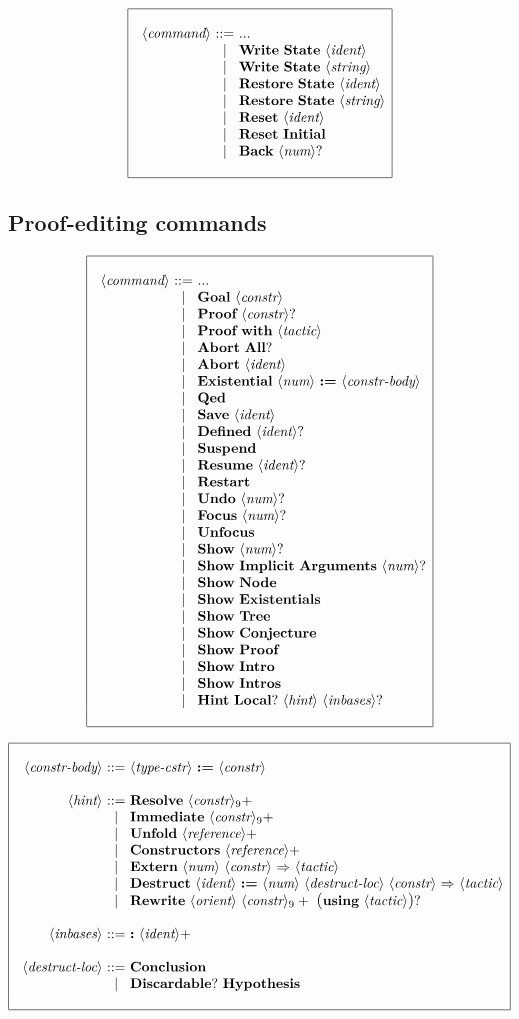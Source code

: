 \documentclass{article}
\makeatletter
\def\GR#1{\text{\large(}#1\text{\large)}}
\def\NT#1{\langle\textit{#1}\rangle}
\def\NTL#1#2{\langle\textit{#1}\rangle_{#2}}
\def\TERM#1{{\bf\textrm{\bf #1}}}
\def\KWD#1{\TERM{#1}}
\def\PLUS#1{#1+}
\def\OPT#1{#1?}
\def\OPTGR#1{\GR{#1}?}
\newenvironment{cadre}
        {\begin{array}{|c|}\hline\\}
        {\\\\\hline\end{array}}
\newenvironment{rulebox}
        {$$\begin{cadre}\begin{array}{r@{~}c@{~}l@{}l@{}r}}
        {\end{array}\end{cadre}$$}
\def\DEFNT#1{\NT{#1} & ::= &}
\def\EXTNT#1{\NT{#1} & ::= & ... \\&|&}
\def\SEPDEF{\\\\}
\def\nlsep{\\&|&}
\newenvironment{rules}
        {\begin{center}\begin{rulebox}}
        {\end{rulebox}\end{center}}
\makeatother
\begin{document}
\begin{rules}
\EXTNT{command}
       \TERM{Write}~\TERM{State}~\NT{ident}
\nlsep \TERM{Write}~\TERM{State}~\NT{string}
\nlsep \TERM{Restore}~\TERM{State}~\NT{ident}
\nlsep \TERM{Restore}~\TERM{State}~\NT{string}
\nlsep \TERM{Reset}~\NT{ident}
\nlsep \TERM{Reset}~\TERM{Initial}
\nlsep \TERM{Back}~\OPT{\NT{num}}
\end{rules}

\subsection{Proof-editing commands}

\begin{rules}
\EXTNT{command}
       \TERM{Goal}~\NT{constr}
\nlsep \TERM{Proof}~\OPT{\NT{constr}}
\nlsep \TERM{Proof}~\KWD{with}~\NT{tactic}
\nlsep \TERM{Abort}~\OPT{\TERM{All}}
\nlsep \TERM{Abort}~\NT{ident}
\nlsep \TERM{Existential}~\NT{num}~\KWD{:=}~\NT{constr-body}
\nlsep \TERM{Qed}
\nlsep \TERM{Save}~\NT{ident}
\nlsep \TERM{Defined}~\OPT{\NT{ident}}
\nlsep \TERM{Suspend}
\nlsep \TERM{Resume}~\OPT{\NT{ident}}
\nlsep \TERM{Restart}
\nlsep \TERM{Undo}~\OPT{\NT{num}}
\nlsep \TERM{Focus}~\OPT{\NT{num}}
\nlsep \TERM{Unfocus}
\nlsep \TERM{Show}~\OPT{\NT{num}}
\nlsep \TERM{Show}~\TERM{Implicit}~\TERM{Arguments}~\OPT{\NT{num}}
\nlsep \TERM{Show}~\TERM{Node}
\nlsep \TERM{Show}~\TERM{Existentials}
\nlsep \TERM{Show}~\TERM{Tree}
\nlsep \TERM{Show}~\TERM{Conjecture}
\nlsep \TERM{Show}~\TERM{Proof}
\nlsep \TERM{Show}~\TERM{Intro}
\nlsep \TERM{Show}~\TERM{Intros}
\nlsep \TERM{Hint}~\OPT{\TERM{Local}}~\NT{hint}~\OPT{\NT{inbases}}
\end{rules}


\begin{rules}
\DEFNT{constr-body}
       \NT{type-cstr}~\KWD{:=}~\NT{constr}
\SEPDEF
\DEFNT{hint}
       \TERM{Resolve}~\PLUS{\NTL{constr}{9}}
\nlsep \TERM{Immediate}~\PLUS{\NTL{constr}{9}}
\nlsep \TERM{Unfold}~\PLUS{\NT{reference}}
\nlsep \TERM{Constructors}~\PLUS{\NT{reference}}
\nlsep \TERM{Extern}~\NT{num}~\NT{constr}~\KWD{$\Rightarrow$}~\NT{tactic}
\nlsep \TERM{Destruct}~\NT{ident}~\KWD{:=}~\NT{num}~\NT{destruct-loc}
       ~\NT{constr}~\KWD{$\Rightarrow$}~\NT{tactic}
\nlsep \TERM{Rewrite}~\NT{orient}~\PLUS{\NTL{constr}{9}}
       ~\OPTGR{\KWD{using}~\NT{tactic}}
\SEPDEF
\DEFNT{inbases}
       \KWD{:}~\PLUS{\NT{ident}}
\SEPDEF
\DEFNT{destruct-loc}
       \TERM{Conclusion}
\nlsep \OPT{\TERM{Discardable}}~\TERM{Hypothesis}
\end{rules}
\end{document}

